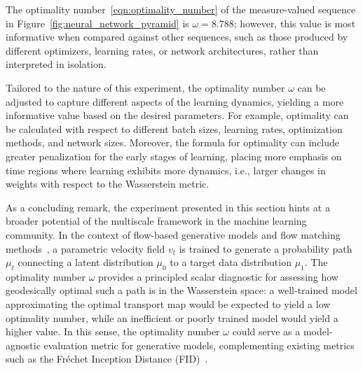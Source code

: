 \documentclass[12pt]{amsart}
\begin{document}
The optimality number~\eqref{eqn:optimality_number} of the measure-valued sequence in Figure~\ref{fig:neural_network_pyramid} is $\omega = 8.788$; however, this value is most informative when compared against other sequences, such as those produced by different optimizers, learning rates, or network architectures, rather than interpreted in isolation.

Tailored to the nature of this experiment, the optimality number $\omega$ can be adjusted to capture different aspects of the learning dynamics, yielding a more informative value based on the desired parameters. For example, optimality can be calculated with respect to different batch sizes, learning rates, optimization methods, and network sizes. Moreover, the formula for optimality can include greater penalization for the early stages of learning, placing more emphasis on time regions where learning exhibits more dynamics, i.e., larger changes in weights with respect to the Wasserstein metric.

As a concluding remark, the experiment presented in this section hints at a broader potential of the multiscale framework in the machine learning community. In the context of flow-based generative models and flow matching methods~\cite{lipman2022flow}, a parametric velocity field $v_t$ is trained to generate a probability path $\mu_t$ connecting a latent distribution $\mu_0$ to a target data distribution $\mu_1$. The optimality number $\omega$ provides a principled scalar diagnostic for assessing how geodesically optimal such a path is in the Wasserstein space: a well-trained model approximating the optimal transport map would be expected to yield a low optimality number, while an inefficient or poorly trained model would yield a higher value. In this sense, the optimality number $\omega$ could serve as a model-agnostic evaluation metric for generative models, complementing existing metrics such as the Fr\'echet Inception Distance (FID)~\cite{heusel2017gans}.


\end{document}
